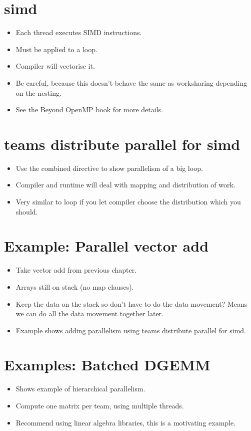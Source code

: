 \section{simd}
\begin{itemize}
  \item Each thread executes SIMD instructions.
  \item Must be applied to a loop.
  \item Compiler will vectorise it.
  \item Be careful, because this doesn't behave the same as worksharing depending on the nesting.
  \item See the Beyond OpenMP book for more details.
\end{itemize}

\section{teams distribute parallel for simd}
\begin{itemize}
  \item Use the combined directive to show parallelism of a big loop.
  \item Compiler and runtime will deal with mapping and distribution of work.
  \item Very similar to loop if you let compiler choose the distribution which you should.
\end{itemize}

\section{Example: Parallel vector add}
\begin{itemize}
  \item Take vector add from previous chapter.
  \item Arrays still on stack (no map clauses).
  \item Keep the data on the stack so don’t have to do the data movement? Means we can do all the data movement together later.
  \item Example shows adding parallelism using teams distribute parallel for simd.
\end{itemize}

\section{Examples: Batched DGEMM}
\begin{itemize}
  \item Shows example of hierarchical parallelism.
  \item Compute one matrix per team, using multiple threads.
  \item Recommend using linear algebra libraries, this is a motivating example.
\end{itemize}

